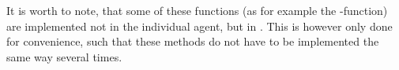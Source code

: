 It is worth to note, that some of these functions (as for example the -function) are implemented not in the individual agent, but in . This is however only done for convenience, such that these methods do not have to be implemented the same way several times.





%
%
%




%
%




